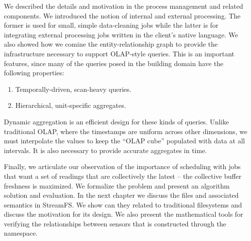
We described the details and motivation in the process management and related components.  We introduced the 
notion of internal and external processing.  The former is used for small, simple data-cleaning jobs while the latter
is for integrating external processing jobs written in the client's native language.
We also showed how we comine the entity-relationship graph to provide the infrastructure necessary to support OLAP-style queries.
This is an important features, since many of the queries posed in the building domain have the following properties:

\begin{enumerate}
\item Temporally-driven, scan-heavy queries.
\item Hierarchical, unit-specific aggregates.
\end{enumerate}

Dynamic aggregation is an efficient design for these kinds of queries.  Unlike traditional OLAP, where the timestamps
are uniform across other dimensions, we must interpolate the values to keep the ``OLAP cube'' populated with data at all
intervals.  It is also necessary to provide accurate aggregates in time.

Finally, we articulate our observation of the importance of scheduling with jobs that want a set of readings that are collectively
the latest -- the collective buffer freshness is maximized.  We formalize the problem and present an algorithm solution and evaluation.
In the next chapter we discuss the files and associated semantics in StreamFS.  We show can they related to traditional filesystems
and discuss the motivation for its design.  We also present the mathematical tools for verifying the relationships between sensors that
is constructed through the namespace.